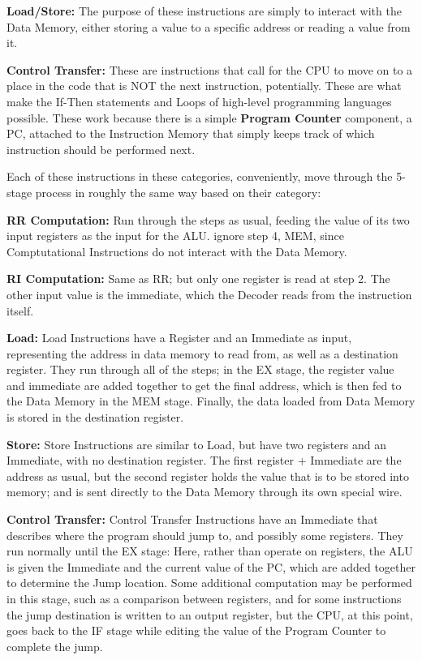 \documentclass[12pt,twoside]{reedthesis}
\begin{document}
\textbf{Load/Store:} The purpose of these instructions are simply to interact with the Data Memory, either storing a value to a specific address or reading a value from it.

\textbf{Control Transfer:} These are instructions that call for the CPU to move on to a place in the code that is NOT the next instruction, potentially. These are what make the If-Then statements and Loops of high-level programming languages possible. These work because there is a simple \textbf{Program Counter} component, a PC, attached to the Instruction Memory that simply keeps track of which instruction should be performed next.

Each of these instructions in these categories, conveniently, move through the 5-stage process in roughly the same way based on their category:

\textbf{RR Computation:} Run through the steps as usual, feeding the value of its two input registers as the input for the ALU. ignore step 4, MEM, since Comptutational Instructions do not interact with the Data Memory.

\textbf{RI Computation:} Same as RR; but only one register is read at step 2. The other input value is the immediate, which the Decoder reads from the instruction itself.

\textbf{Load:} Load Instructions have a Register and an Immediate as input, representing the address in data memory to read from, as well as a destination register. They run through all of the steps; in the EX stage, the register value and immediate are added together to get the final address, which is then fed to the Data Memory in the MEM stage. Finally, the data loaded from Data Memory is stored in the destination register.

\textbf{Store:} Store Instructions are similar to Load, but have two registers and an Immediate, with no destination register. The first register + Immediate are the address as usual, but the second register holds the value that is to be stored into memory; and is sent directly to the Data Memory through its own special wire.

\textbf{Control Transfer:} Control Transfer Instructions have an Immediate that describes where the program should jump to, and possibly some registers. They run normally until the EX stage: Here, rather than operate on registers, the ALU is given the Immediate and the current value of the PC, which are added together to determine the Jump location. Some additional computation may be performed in this stage, such as a comparison between registers, and for some instructions the jump destination is written to an output register, but the CPU, at this point, goes back to the IF stage while editing the value of the Program Counter to complete the jump.
\end{document}
